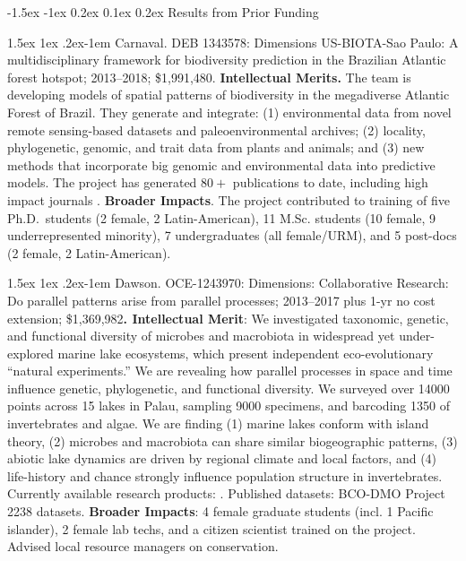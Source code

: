 \documentclass[11pt]{article}
\makeatletter
\renewcommand\section{\@startsection{section}{1}{\z@}%
                                  {-1.5ex \@plus -1ex \@minus 0.2ex}%
                                  {0.1ex \@plus 0.2ex}%
                                  {\normalfont\Large\bfseries}}
\renewcommand{\paragraph}{\@startsection{paragraph}{4}{\z@}
  {1.5ex \@plus 1ex \@minus .2ex}{-1em}
  {\normalfont\normalsize\it}
}
\makeatother
\begin{document}
\section{Results from Prior Funding} \label{results-from-prior-funding}

\paragraph{Carnaval.} DEB 1343578: Dimensions US-BIOTA-Sao Paulo: A
multidisciplinary framework for biodiversity prediction in the Brazilian
Atlantic forest hotspot; 2013--2018; \$1,991,480. \textbf{Intellectual
Merits.} The team is developing models of spatial patterns of
biodiversity in the megadiverse Atlantic Forest of Brazil. They generate
and integrate: (1) environmental data from novel remote sensing-based
datasets and paleoenvironmental archives; (2) locality, phylogenetic,
genomic, and trait data from plants and animals; and (3) new methods
that incorporate big genomic and environmental data into predictive
models. The project has generated $80+$ publications to date,
including high impact journals
\cite{Do_Amaral2016-bi,Prates2016-at,Prates2016-gr,Maestri2016-bp,Zamborlini_Saiter2016-zu,Montade2016-wl,Bernal2016-pd,Bustamante2016-qt,Gu2017-oz}.
\textbf{Broader Impacts}. The project contributed to training of five
Ph.D.~students (2 female, 2 Latin-American), 11 M.Sc. students (10
female, 9 underrepresented minority), 7 undergraduates (all female/URM),
and 5 post-docs (2 female, 2 Latin-American).

\paragraph{Dawson. }OCE-1243970: Dimensions: Collaborative Research: Do
parallel patterns arise from parallel processes; 2013--2017 plus 1-yr no
cost extension; \$1,369,982\textbf{. Intellectual Merit}: We
investigated taxonomic, genetic, and functional diversity of microbes
and macrobiota in widespread yet under-explored marine lake ecosystems,
which present independent eco-evolutionary ``natural experiments.'' We
are revealing how parallel processes in space and time influence
genetic, phylogenetic, and functional diversity. We surveyed over 14000
points across 15 lakes in Palau, sampling 9000 specimens, and barcoding
1350 of invertebrates and algae. We are finding (1) marine lakes conform
with island theory, (2) microbes and macrobiota can share similar
biogeographic patterns, (3) abiotic lake dynamics are driven by regional
climate and local factors, and (4) life-history and chance strongly
influence population structure in invertebrates. Currently available
research products:
\cite{Dawson2016-zv,Dawson2016-aq,Meyerhof2016-fs,Schiebelhut2017-bp,Swift2016-iq,Wilson2017-en}.
Published datasets: BCO-DMO Project 2238 datasets. \textbf{Broader
Impacts}: 4 female graduate students (incl. 1 Pacific islander), 2
female lab techs, and a citizen scientist trained on the project.
Advised local resource managers on conservation.
\end{document}
